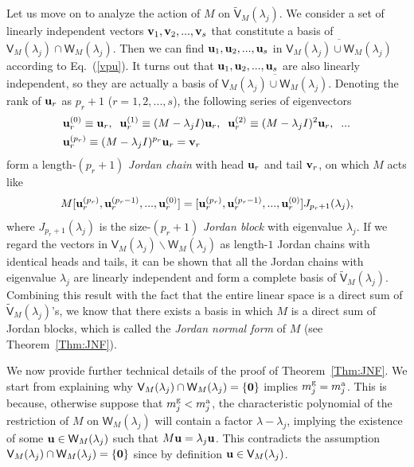 \documentclass{tADP2e}
\theoremstyle{plain}
\theoremstyle{plain}
\theoremstyle{definition}
\begin{document}
\begin{appendices}
Let us move on to analyze the action of $M$ on $\tilde{\textsf{V}}_M(\lambda_j)$. We consider a set of linearly independent vectors $\bold{v}_1,\bold{v}_2,...,\bold{v}_s$ that constitute a basis of $\textsf{V}_M(\lambda_j)\cap \textsf{W}_M(\lambda_j)$. Then we can find $\bold{u}_1,\bold{u}_2,...,\bold{u}_s$ in $\overline{\textsf{V}_M(\lambda_j)\cup \textsf{W}_M(\lambda_j)}$ according to Eq.~(\ref{vpu}). It turns out that $\bold{u}_1,\bold{u}_2,...,\bold{u}_s$ are also linearly independent, so they are actually a basis of $\overline{\textsf{V}_M(\lambda_j)\cup \textsf{W}_M(\lambda_j)}$. Denoting the rank of $\bold{u}_r$ as $p_r+1$ ($r=1,2,...,s$), the following series of eigenvectors
\begin{equation}
\begin{split}
&\bold{u}^{(0)}_r\equiv\bold{u}_r,\;\;
\bold{u}^{(1)}_r\equiv(M-\lambda_j I)\bold{u}_r,\;\;
\bold{u}^{(2)}_r\equiv(M-\lambda_j I)^2\bold{u}_r,\;\;... \\
&\bold{u}^{(p_r)}_r\equiv(M-\lambda_j I)^{p_r}\bold{u}_r=\bold{v}_r
\end{split}
\end{equation}
form a length-$(p_r+1)$ \emph{Jordan chain} with head $\bold{u}_r$ and tail $\bold{v}_r$, on which $M$ acts like
\begin{equation}
M[\bold{u}^{(p_r)}_r,\bold{u}^{(p_r-1)}_r,...,\bold{u}^{(0)}_r] =[\bold{u}^{(p_r)}_r,\bold{u}^{(p_r-1)}_r,...,\bold{u}^{(0)}_r] J_{p_r+1}(\lambda_j), 
\end{equation}
where $J_{p_r+1}(\lambda_j)$ is the size-$(p_r+1)$ \emph{Jordan block} with eigenvalue $\lambda_j$. 
If we regard the vectors in $\textsf{V}_M(\lambda_j)\backslash\textsf{W}_M(\lambda_j)$ as length-$1$ Jordan chains with identical heads and tails, it can be shown that all the Jordan chains with eigenvalue $\lambda_j$ are linearly independent and form a complete basis of $\tilde{\textsf{V}}_M(\lambda_j)$. Combining this result with the fact that the entire linear space is a direct sum of $\tilde{\textsf{V}}_M(\lambda_j)$'s, we know that there exists a basis in which $M$ is a direct sum of Jordan blocks, which is called the \emph{Jordan normal form} of $M$ (see Theorem~\ref{Thm:JNF}).

We now provide further technical details of the proof of Theorem~\ref{Thm:JNF}. We start from explaining why $\textsf{V}_M(\lambda_j)\cap \textsf{W}_M(\lambda_j)=\{\bold{0}\}$ implies $m^{\rm g}_j=m^{\rm a}_j$. This is because, otherwise suppose that $m^{\rm g}_j<m^{\rm a}_j$, the characteristic polynomial of the restriction of $M$ on $\textsf{W}_M(\lambda_j)$ will contain a factor $\lambda-\lambda_j$, implying the existence of some $\bold{u}\in \textsf{W}_M(\lambda_j)$ such that $M\bold{u}=\lambda_j\bold{u}$. This contradicts the assumption $\textsf{V}_M(\lambda_j)\cap \textsf{W}_M(\lambda_j)=\{\bold{0}\}$ since by definition $\bold{u}\in\textsf{V}_M(\lambda_j)$. 
 


\end{appendices}
\end{document}
